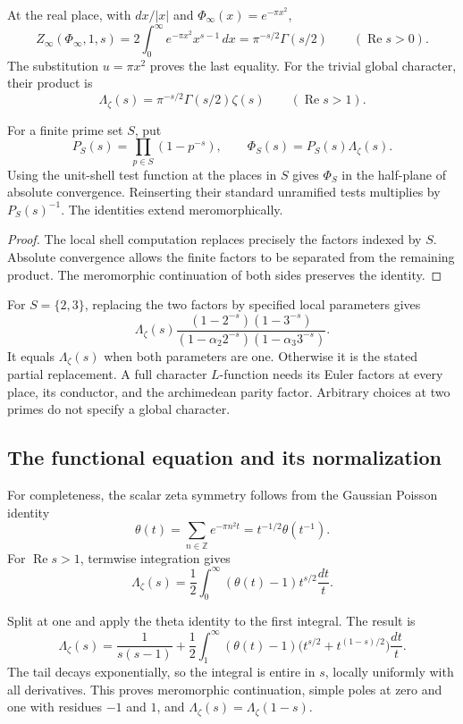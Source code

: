 At the real place, with $dx/|x|$ and $\Phi_\infty(x)=e^{-\pi x^2}$,
\[
 Z_\infty(\Phi_\infty,1,s)
  =2\int_0^\infty e^{-\pi x^2}x^{s-1}\,dx
  =\pi^{-s/2}\Gamma(s/2)
       \qquad(\operatorname{Re}s>0).
\]
The substitution $u=\pi x^2$ proves the last equality. For the trivial
global character, their product is
\[
 \Lambda_\zeta(s)=\pi^{-s/2}\Gamma(s/2)\zeta(s)
       \qquad(\operatorname{Re}s>1).
\]

\begin{proposition}
\label{v4-arith:traces:euler-removal}
For a finite prime set $S$, put
\[
 P_S(s)=\prod_{p\in S}(1-p^{-s}),\qquad
 \Phi_S(s)=P_S(s)\Lambda_\zeta(s).
\]
Using the unit-shell test function at the places in $S$ gives $\Phi_S$ in
the half-plane of absolute convergence. Reinserting their standard
unramified tests multiplies by $P_S(s)^{-1}$. The identities extend
meromorphically.
\end{proposition}
\begin{proof}
The local shell computation replaces precisely the factors indexed by $S$.
Absolute convergence allows the finite factors to be separated from the
remaining product. The meromorphic continuation of both sides preserves the
identity.
\end{proof}

For $S=\{2,3\}$, replacing the two factors by specified local parameters
gives
\[
 \Lambda_\zeta(s)
  \frac{(1-2^{-s})(1-3^{-s})}
       {(1-\alpha_2 2^{-s})(1-\alpha_3 3^{-s})}.
\]
It equals $\Lambda_\zeta(s)$ when both parameters are one. Otherwise it is
the stated partial replacement. A full character $L$-function needs its
Euler factors at every place, its conductor, and the archimedean parity
factor. Arbitrary choices at two primes do not specify a global character.

\subsection{The functional equation and its normalization}

For completeness, the scalar zeta symmetry follows from the Gaussian Poisson
identity
\[
 \theta(t)=\sum_{n\in\mathbb Z}e^{-\pi n^2t}
          =t^{-1/2}\theta(t^{-1}).
\]
For $\operatorname{Re}s>1$, termwise integration gives
\[
 \Lambda_\zeta(s)
   =\frac12\int_0^\infty(\theta(t)-1)t^{s/2}\frac{dt}{t}.
\]

Split at one and apply the theta identity to the first integral. The result
is
\begin{equation}
\label{v4-arith:traces:theta-continuation}
 \Lambda_\zeta(s)=\frac1{s(s-1)}
 +\frac12\int_1^\infty(\theta(t)-1)
       \bigl(t^{s/2}+t^{(1-s)/2}\bigr)\frac{dt}{t}.
\end{equation}
The tail decays exponentially, so the integral is entire in $s$, locally
uniformly with all derivatives. This proves meromorphic continuation, simple
poles at zero and one with residues $-1$ and $1$, and
$\Lambda_\zeta(s)=\Lambda_\zeta(1-s)$.

